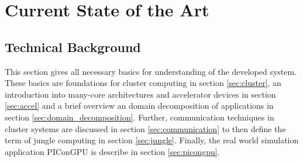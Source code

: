 \chapter{Current State of the Art}
\label{sec:state}






\section{Technical Background}
\label{sec:technical_background}
This section gives all necessary basics for understanding of the
developed system.  These basics are foundations for cluster computing
in section \ref{sec:cluster}, an introduction into many-core
architectures and accelerator devices in section \ref{sec:accel} and
a brief overview an domain decomposition of applications in section
\ref{sec:domain_decomposition}. Further, communication techniques in
cluster systems are discussed in section \ref{sec:communication} to then
define the term of jungle computing in section \ref{sec:jungle}. Finally, the
real world simulation application PIConGPU is describe in section \ref{sec:picongpu}.

